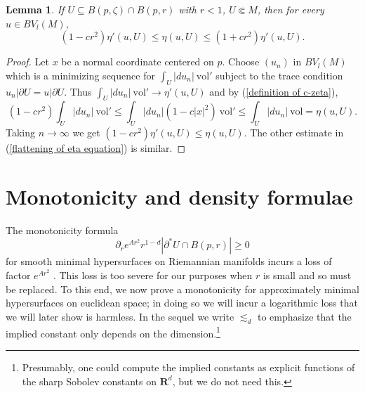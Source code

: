 \documentclass[reqno,12pt,letterpaper]{amsart}
\newcommand{\RR}{\mathbf{R}}
\newcommand{\vol}{\mathrm{vol}}
\newtheorem{lemma}[theorem]{Lemma}
\theoremstyle{definition}
\numberwithin{equation}{section}
\begin{document}
\begin{lemma}\label{flattening of eta}
If $U \subseteq B(p, \zeta) \cap B(p, r)$ with $r < 1$, $U \Subset M$, then for every $u \in BV_l(M)$,
\begin{equation}\label{flattening of eta equation}
(1 - cr^2) \eta'(u, U) \leq \eta(u, U) \leq (1 + cr^2) \eta'(u, U).
\end{equation}
\end{lemma}
\begin{proof}
Let $x$ be a normal coordinate centered on $p$.
Choose $(u_n)$ in $BV_l(M)$ which is a minimizing sequence for $\int_U |du_n| ~\vol'$ subject to the trace condition $u_n|\partial U = u|\partial U$.
Thus $\int_U |du_n| ~\vol' \to \eta'(u, U)$ and by (\ref{definition of c-zeta}),
$$(1 - cr^2) \int_U |du_n| ~\vol' \leq \int_U |du_n| (1 - c|x|^2) ~\vol' \leq \int_U |du_n| ~\vol = \eta(u, U).$$
Taking $n \to \infty$ we get $(1 - cr^2) \eta'(u, U) \leq \eta(u, U)$.
The other estimate in (\ref{flattening of eta equation}) is similar.
\end{proof}



\section{Monotonicity and density formulae}\label{inequalities}
The monotonicity formula
\begin{equation}\label{classic monotonicity formula}
\partial_r e^{Ar^2}r^{1 - d} |\partial^* U \cap B(p, r)| \geq 0
\end{equation}
for smooth minimal hypersurfaces on Riemannian manifolds incurs a loss of factor $e^{Ar^2}$ \cite[\S7]{MarquesXX}.
This loss is too severe for our purposes when $r$ is small and so must be replaced.
To this end, we now prove a monotonicity for approximately minimal hypersurfaces on euclidean space; in doing so we will incur a logarithmic loss that we will later show is harmless.
In the sequel we write $\lesssim_d$ to emphasize that the implied constant only depends on the dimension.\footnote{Presumably, one could compute the implied constants as explicit functions of the sharp Sobolev constants on $\RR^d$, but we do not need this.}
\end{document}
